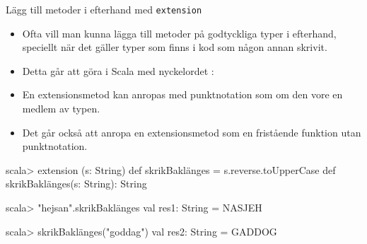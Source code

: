 \begin{Slide}{Lägg till metoder i efterhand med \texttt{extension}}\SlideFontSmall
\begin{itemize}\SlideFontSmall
\item Ofta vill man kunna lägga till metoder på godtyckliga typer i efterhand, speciellt när det gäller typer som finns i kod som någon annan skrivit.
\item Detta går att göra i Scala med nyckelordet :\\{\SlideFontTiny{}}
\item En extensionsmetod kan anropas med punktnotation som om den vore en medlem av typen.
\item Det går också att anropa en extensionsmetod som en fristående funktion utan punktnotation.
\end{itemize}  
\begin{REPL}
scala> extension (s: String) def skrikBaklänges = s.reverse.toUpperCase
def skrikBaklänges(s: String): String

scala> "hejsan".skrikBaklänges
val res1: String = NASJEH

scala> skrikBaklänges("goddag")
val res2: String = GADDOG
\end{REPL}
\end{Slide}




